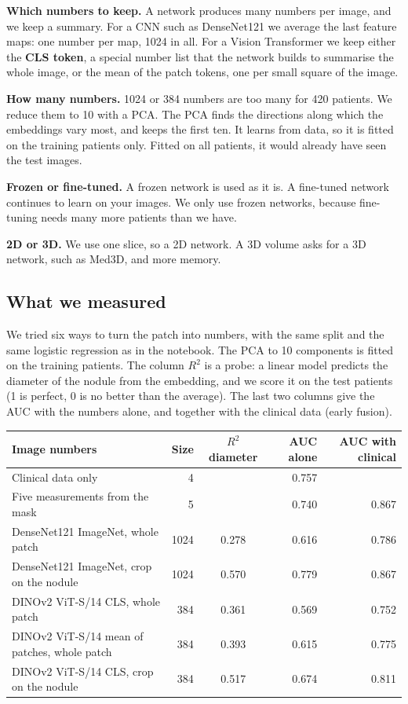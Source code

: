 \documentclass[11pt,a4paper]{article}
\newcommand{\term}[1]{\textbf{#1}}
\begin{document}
\textbf{Which numbers to keep.} A network produces many numbers per image, and we keep a summary. For a CNN such
as DenseNet121 we average the last feature maps: one number per map, 1024 in all. For a Vision Transformer we keep
either the \term{CLS token}, a special number list that the network builds to summarise the whole image, or the
mean of the patch tokens, one per small square of the image.

\textbf{How many numbers.} 1024 or 384 numbers are too many for 420 patients. We reduce them to 10 with a PCA.
The PCA finds the directions along which the embeddings vary most, and keeps the first ten. It learns from data,
so it is fitted on the training patients only. Fitted on all patients, it would already have seen the test images.

\textbf{Frozen or fine-tuned.} A frozen network is used as it is. A fine-tuned network continues to learn on your
images. We only use frozen networks, because fine-tuning needs many more patients than we have.

\textbf{2D or 3D.} We use one slice, so a 2D network. A 3D volume asks for a 3D network, such as Med3D, and more
memory.

\subsection{What we measured}

We tried six ways to turn the patch into numbers, with the same split and the same logistic regression as in the
notebook. The PCA to 10 components is fitted on the training patients. The column $R^2$ is a probe: a linear model
predicts the diameter of the nodule from the embedding, and we score it on the test patients (1 is perfect, 0 is
no better than the average). The last two columns give the AUC with the numbers alone, and together with the
clinical data (early fusion).

\begin{center}
\small
\begin{tabular}{@{}lrcrr@{}}
\toprule
Image numbers & Size & $R^2$ diameter & AUC alone & AUC with clinical \\
\midrule
Clinical data only & 4 & & 0.757 & \\
Five measurements from the mask & 5 & & 0.740 & 0.867 \\
DenseNet121 ImageNet, whole patch & 1024 & 0.278 & 0.616 & 0.786 \\
DenseNet121 ImageNet, crop on the nodule & 1024 & 0.570 & 0.779 & 0.867 \\
DINOv2 ViT-S/14 CLS, whole patch & 384 & 0.361 & 0.569 & 0.752 \\
DINOv2 ViT-S/14 mean of patches, whole patch & 384 & 0.393 & 0.615 & 0.775 \\
DINOv2 ViT-S/14 CLS, crop on the nodule & 384 & 0.517 & 0.674 & 0.811 \\
\bottomrule
\end{tabular}
\end{center}
\end{document}
